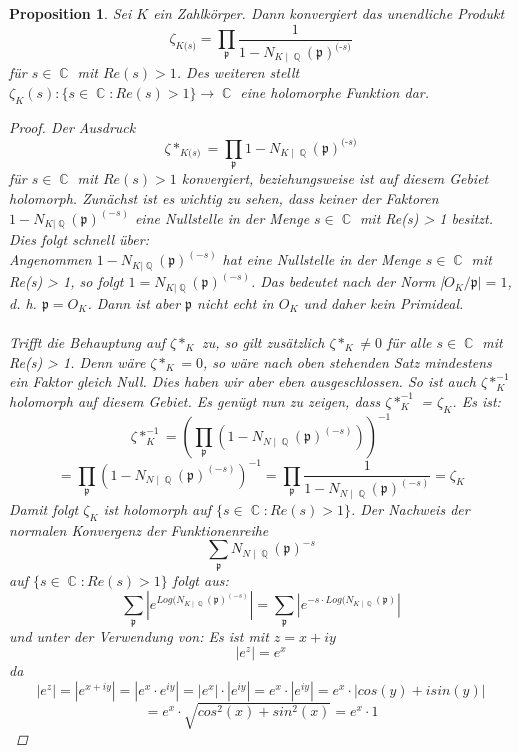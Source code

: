 \documentclass[10pt,a4paper]{article}
\theoremstyle{plain}
\newtheorem{prop}[thm]{Proposition}
\theoremstyle{definition}
\theoremstyle{remark}
\DeclareMathOperator{\C}{\mathbb{C}}
\DeclareMathOperator{\Q}{\mathbb{Q}}
\begin{document}
\begin{prop}

Sei $\textit{K}$ ein Zahlkörper. Dann konvergiert das unendliche Produkt $$\zeta_{\textit{K} \textit{(s)}}= \prod_{\mathfrak{p}}\frac{1}{1- N_{\textit{K}\mid\Q}(\mathfrak{p})^\textit{(-s)}}$$ für $s \in \C $ mit $ Re(s) > 1$. Des weiteren stellt $\zeta_{K}(s)\colon \{ s \in \C \colon Re(s)>1\} \rightarrow \C$ eine holomorphe Funktion dar.

\begin{proof}
Der Ausdruck
$$\zeta*_{\textit{K} \textit{(s)}}= \prod_{\mathfrak{p}}1- N_{\textit{K}\mid\Q}(\mathfrak{p})^\textit{(-s)}$$ für $s \in \C$ mit $Re(s) > 1$ konvergiert, beziehungsweise ist auf diesem Gebiet holomorph.
Zunächst ist es wichtig zu sehen, dass keiner der Faktoren $ 1- N_{K|\Q}(\mathfrak{p})^{(-s)}$ eine Nullstelle in der Menge $s \in \C$ mit Re(s) > 1 besitzt.
\\
Dies folgt schnell über: 
\\
Angenommen $1- N_{K|\Q}(\mathfrak{p})^{(-s)}$ hat eine Nullstelle in der Menge  $s \in \C $ mit Re(s) > 1, so folgt $1 = N_{K|\Q}(\mathfrak{p})^{(-s)}$. Das bedeutet nach der Norm |$O_K /\mathfrak{p}| = 1$, d. h. $\mathfrak{p} = O_K$. Dann ist aber $\mathfrak{p}$ nicht echt in $O_K$ und daher kein Primideal. \\
\\
Trifft die Behauptung auf $\zeta*_{K}$ zu, so gilt zusätzlich $\zeta*_{K} \neq 0$ für alle  $s \in \C$ mit Re(s) > 1. Denn wäre  $\zeta*_{K} = 0$, so wäre nach oben stehenden Satz mindestens ein Faktor gleich Null. Dies haben wir aber eben ausgeschlossen. So ist auch  $\zeta*_{K}^{-1}$ holomorph auf diesem Gebiet. Es genügt nun zu zeigen, dass 
$\zeta*_{K}^{-1}$ = $\zeta_{K}$. Es ist: $$\zeta*_{K}^{-1}=(\prod_{\mathfrak{p}}(1 - N_{N\mid\Q}(\mathfrak{p})^{(-s)}))^{-1} $$ $$=\prod_{\mathfrak{p}}(1 - N_{N\mid\Q}(\mathfrak{p})^{(-s)})^{-1} = \prod_{\mathfrak{p}}\frac{1}{1 - N_{N\mid\Q}(\mathfrak{p})^{(-s)}}=\zeta_{K}$$
Damit folgt $\zeta_{K}$ ist holomorph auf $\{ s \in \C \colon Re(s) > 1\}$. Der Nachweis der normalen Konvergenz der Funktionenreihe $$\sum_{\mathfrak{p}}N_{N\mid\Q}(\mathfrak{p})^{-s}$$ auf $\{ s \in \C \colon Re(s) > 1\}$ folgt aus:$$\sum_{\mathfrak{p}}|e^{Log(N_{K\mid \Q}(\mathfrak{p})^{(-s)}}| = \sum_{\mathfrak{p}}|e^{-s\cdot Log(N_{K\mid \Q}(\mathfrak{p})}|$$
 und unter der Verwendung von: 
 Es ist mit $z = x + iy$ $$|e^z| = e^x $$ da $$|e^z|=|e^{x+iy}|=|e^{x}\cdot e^{iy}|= |e^{x}|\cdot |e^{iy}| = e^{x}\cdot |e^{iy}| = e^x \cdot |cos(y)+isin(y)| $$ $$= e^x\cdot\sqrt{cos^2(x)+sin^2(x)} =e^x\cdot 1$$

\end{proof}
\end{prop}
\end{document}
